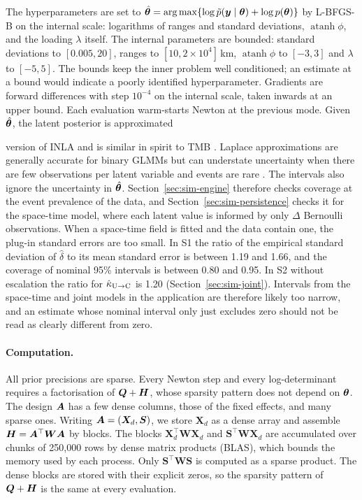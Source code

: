 The hyperparameters are set to
$\hat{\bm{\theta}} = \arg\max\{\log\tilde p(\bm{y}\mid\bm{\theta}) + \log p(\bm{\theta})\}$ by
L-BFGS-B on the internal scale: logarithms of ranges and standard deviations,
$\operatorname{atanh}\phi$, and the loading $\lambda$ itself. The internal parameters
are bounded: standard deviations to $[0.005, 20]$, ranges to $[10, 2\times10^4]$\,km,
$\operatorname{atanh}\phi$ to $[-3, 3]$ and $\lambda$ to $[-5, 5]$. The bounds keep the
inner problem well conditioned; an estimate at a bound would indicate a poorly
identified hyperparameter. Gradients are forward differences with step $10^{-4}$ on
the internal scale, taken inwards at an upper bound. Each evaluation warm-starts
Newton at the previous mode. Given $\hat{\bm{\theta}}$, the latent posterior is approximated

version of INLA \citep{rue2009inla} and is similar in spirit to TMB
\citep{kristensen2016tmb}. Laplace approximations are generally accurate for
binary GLMMs but can understate uncertainty when there are few observations per
latent variable and events are rare \citep{fong2010glmm, ferkingstad2015improving}.
The intervals also ignore the uncertainty in $\hat{\bm{\theta}}$.
Section~\ref{sec:sim-engine} therefore checks coverage at the event prevalence of
the data, and Section~\ref{sec:sim-persistence} checks it for the space-time model,
where each latent value is informed by only $\Delta$ Bernoulli observations. When a
space-time field is fitted and the data contain one, the plug-in standard errors are
too small. In S1 the ratio of the empirical standard deviation of $\hat\delta$ to its
mean standard error is between 1.19 and 1.66, and the coverage of nominal 95\%
intervals is between 0.80 and 0.95. In S2 without escalation the ratio for
$\hat\kappa_{\mathrm{U}\to\mathrm{C}}$ is 1.20 (Section~\ref{sec:sim-joint}). Intervals from the space-time and
joint models in the application are therefore likely too narrow, and an estimate whose
nominal interval only just excludes zero should not be read as clearly different from
zero.

\paragraph{Computation.} All prior precisions are sparse. Every Newton step and every
log-determinant requires a factorisation of $\bm{Q} + \bm{H}$, whose sparsity pattern does
not depend on $\bm{\theta}$. The design $\bm{A}$ has a few dense columns, those of the fixed
effects, and many sparse ones. Writing $\bm{A} = (\bm{X}_d, \bm{S})$, we store
$\bm{X}_d$ as a dense array and assemble $\bm{H} = \bm{A}^\top\bm{W}\bm{A}$ by blocks. The blocks
$\bm{X}_d^\top\bm{W}\bm{X}_d$ and $\bm{S}^\top\bm{W}\bm{X}_d$ are accumulated over chunks
of 250{,}000 rows by dense matrix products (BLAS), which bounds the memory used by
each process. Only $\bm{S}^\top\bm{W}\bm{S}$ is computed as a sparse product. The dense
blocks are stored with their explicit zeros, so the sparsity pattern of $\bm{Q} + \bm{H}$
is the same at every evaluation.

